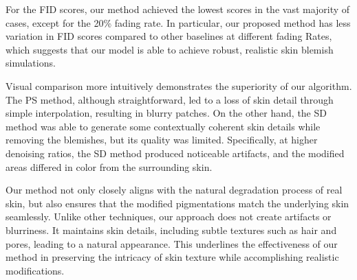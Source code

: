\begin{spacing}{1.5}
\begin{table}[t!]
    \caption{FID scores of different blemish fading rates. Lower scores are better.}
    \label{tbl:fid}
\end{table}

For the FID scores, our method achieved the lowest scores in the vast majority of cases, except for the 20\% fading rate. In particular, our proposed method has less variation in FID scores compared to other baselines at different fading Rates, which suggests that our model is able to achieve robust, realistic skin blemish simulations.

Visual comparison more intuitively demonstrates the superiority of our algorithm. The PS method, although straightforward, led to a loss of skin detail through simple interpolation, resulting in blurry patches. On the other hand, the SD method was able to generate some contextually coherent skin details while removing the blemishes, but its quality was limited. Specifically, at higher denoising ratios, the SD method produced noticeable artifacts, and the modified areas differed in color from the surrounding skin.

Our method not only closely aligns with the natural degradation process of real skin, but also ensures that the modified pigmentations match the underlying skin seamlessly. Unlike other techniques, our approach does not create artifacts or blurriness. It maintains skin details, including subtle textures such as hair and pores, leading to a natural appearance. This underlines the effectiveness of our method in preserving the intricacy of skin texture while accomplishing realistic modifications.


\end{spacing}
